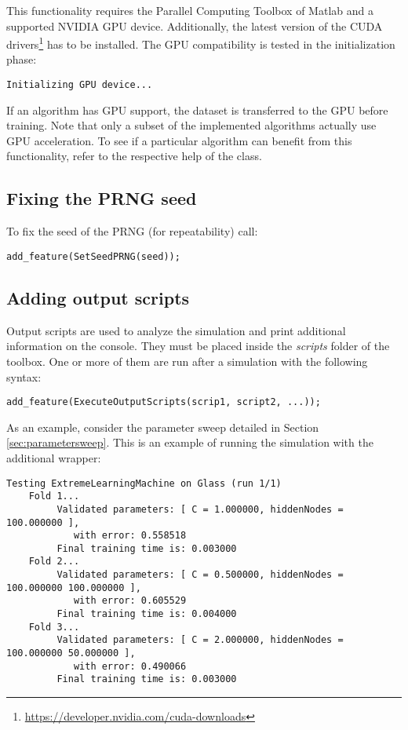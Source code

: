 \noindent This functionality requires the Parallel Computing Toolbox of Matlab and a supported NVIDIA GPU device. Additionally, the latest version of the CUDA drivers\footnote{\url{https://developer.nvidia.com/cuda-downloads}} has to be installed. The GPU compatibility is tested in the initialization phase:

\begin{small}
\begin{verbatim}
Initializing GPU device...
\end{verbatim}
\end{small}

If an algorithm has GPU support, the dataset is transferred to the GPU before training. Note that only a subset of the implemented algorithms actually use GPU acceleration. To see if a particular algorithm can benefit from this functionality, refer to the respective help of the class.

\subsection{Fixing the PRNG seed}

To fix the seed of the PRNG (for repeatability) call:

\begin{lstlisting}
add_feature(SetSeedPRNG(seed));
\end{lstlisting}

\subsection{Adding output scripts}

Output scripts are used to analyze the simulation and print additional information on the console. They must be placed inside the \textit{scripts} folder of the toolbox. One or more of them are run after a simulation with the following syntax:

\begin{lstlisting}
add_feature(ExecuteOutputScripts(scrip1, script2, ...));
\end{lstlisting}

\noindent As an example, consider the parameter sweep detailed in Section \ref{sec:parametersweep}. This is an example of running the simulation with the additional wrapper:

\begin{small}
\begin{verbatim}
Testing ExtremeLearningMachine on Glass (run 1/1)
	Fold 1... 
		 Validated parameters: [ C = 1.000000, hiddenNodes = 100.000000 ], 
		 	with error: 0.558518
		 Final training time is: 0.003000
	Fold 2... 
		 Validated parameters: [ C = 0.500000, hiddenNodes = 100.000000 100.000000 ], 
		 	with error: 0.605529
		 Final training time is: 0.004000
	Fold 3... 
		 Validated parameters: [ C = 2.000000, hiddenNodes = 100.000000 50.000000 ], 
		 	with error: 0.490066
		 Final training time is: 0.003000
\end{verbatim}
\end{small}

